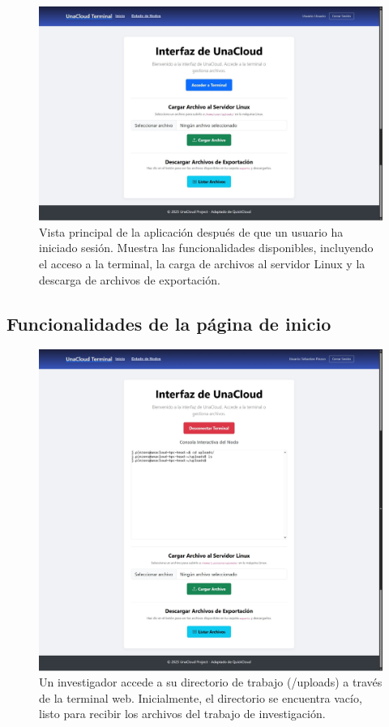 \begin{figure}[H]
    \centering
    \includegraphics[width=0.75\linewidth]{Documento Final/Imagenes/HomePageUser.jpg}
    \caption{Vista principal de la aplicación después de que un usuario ha iniciado sesión. Muestra las funcionalidades disponibles, incluyendo el acceso a la terminal, la carga de archivos al servidor Linux y la descarga de archivos de exportación.}
    \label{fig:LogedIn}
\end{figure}

\subsection{Funcionalidades de la página de inicio}

\begin{figure}[H]
    \centering
    \includegraphics[width=0.75\linewidth]{Documento Final/Imagenes/EmptyUploads.jpg}
    \caption{Un investigador accede a su directorio de trabajo (/uploads) a través de la terminal web. Inicialmente, el directorio se encuentra vacío, listo para recibir los archivos del trabajo de investigación.}
    \label{fig:EmptyUpload}
\end{figure}


